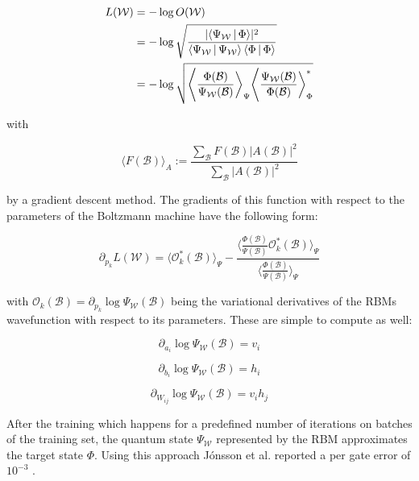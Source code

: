 \begin{align}
    L(\mathcal{W}) &= -\log{O(\mathcal{W})} \\
                   &= -\log{\sqrt{\frac{\lvert \Braket{\Psi_{\mathcal{W}}|\Phi} \rvert^2}{\Braket{\Psi_{\mathcal{W}}|\Psi_{\mathcal{W}}} \Braket{\Phi|\Phi}}}}\\
                   &= -\log{\sqrt{\Bigg\langle \frac{\Phi(\mathcal{B})}{\Psi_{\mathcal{W}}(\mathcal{B})} \bigg \rangle_{\Psi} \Bigg\langle \frac{\Psi_{\mathcal{W}}(\mathcal{B})}{\Phi(\mathcal{B})} \bigg \rangle_{\Phi}^{*}}}
\end{align}

with

\begin{equation}
    \langle F(\mathcal{B})\rangle_A := \frac{\sum_{\mathcal{B}} F(\mathcal{B}) \lvert A(\mathcal{B}) \rvert^2}{\sum_{\mathcal{B}} \lvert A(\mathcal{B})\rvert^2}
\end{equation}

by a gradient descent method. The gradients of this function with respect to 
the parameters of the Boltzmann machine have the following form:

\begin{equation}
   \partial_{p_k}L(\mathcal{W}) = \langle \mathcal{O}_k^*(\mathcal{B}) \rangle_{\Psi} - \frac{\langle \frac{\Phi(\mathcal{B})}{\Psi(\mathcal{B})} \mathcal{O}_k^*(\mathcal{B})\rangle_{\Psi}}{\langle \frac{\Phi(\mathcal{B})}{\Psi(\mathcal{B})} \rangle_{\Psi}}
\end{equation}

with $\mathcal{O}_k(\mathcal{B}) = \partial_{p_k}\log{\Psi_{\mathcal{W}}(\mathcal{B})}$ being the variational derivatives of the RBMs wavefunction with respect to its parameters.
These are simple to compute as well:

\begin{equation}
    \partial_{a_i}\log{\Psi_{\mathcal{W}}(\mathcal{B})} = v_i
\end{equation}

\begin{equation}
    \partial_{b_i}\log{\Psi_{\mathcal{W}}(\mathcal{B})} = h_i
\end{equation}

\begin{equation}
    \partial_{W_{ij}}\log{\Psi_{\mathcal{W}}(\mathcal{B})} = v_ih_j
\end{equation}

After the training which happens for a predefined number of iterations on batches of the training set,
the quantum state $\Psi_{\mathcal{W}}$ represented by the RBM approximates the target state $\Phi$. Using
this approach J\'{o}nsson et al. reported a per gate error of $10^{-3}$ \cite{jnsson2018neuralnetwork}.